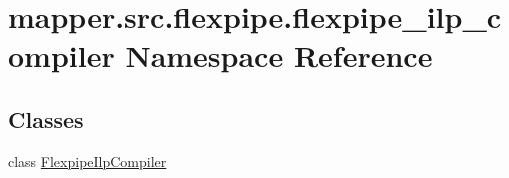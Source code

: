 \hypertarget{namespacemapper_1_1src_1_1flexpipe_1_1flexpipe__ilp__compiler}{}\section{mapper.\+src.\+flexpipe.\+flexpipe\+\_\+ilp\+\_\+compiler Namespace Reference}
\label{namespacemapper_1_1src_1_1flexpipe_1_1flexpipe__ilp__compiler}
\subsection*{Classes}
\begin{DoxyCompactItemize}
\item 
class \hyperlink{classmapper_1_1src_1_1flexpipe_1_1flexpipe__ilp__compiler_1_1_flexpipe_ilp_compiler}{Flexpipe\+Ilp\+Compiler}
\end{DoxyCompactItemize}
